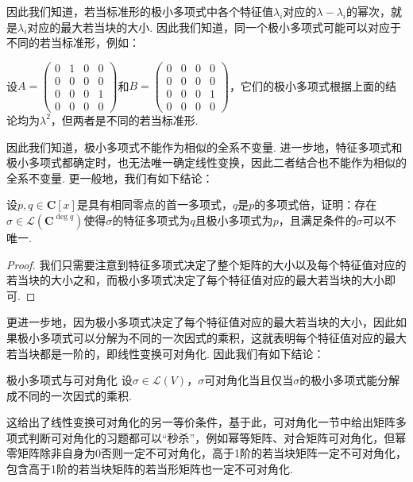 因此我们知道，若当标准形的极小多项式中各个特征值$\lambda_i$对应的$\lambda-\lambda_i$的幂次，就是$\lambda_i$对应的最大若当块的大小. 因此我们知道，同一个极小多项式可能可以对应于不同的若当标准形，例如：
\begin{example}{}{}
    设$A=\begin{pmatrix}
            0 & 1 & 0 & 0 \\ 0 & 0 & 0 & 0 \\ 0 & 0 & 0 & 1 \\ 0 & 0 & 0 & 0
        \end{pmatrix}$和$B=\begin{pmatrix}
            0 & 0 & 0 & 0 \\ 0 & 0 & 0 & 0 \\ 0 & 0 & 0 & 1 \\ 0 & 0 & 0 & 0
        \end{pmatrix}$，它们的极小多项式根据上面的结论均为$\lambda^2$，但两者是不同的若当标准形.
\end{example}

因此我们知道，极小多项式不能作为相似的全系不变量. 进一步地，特征多项式和极小多项式都确定时，也无法唯一确定线性变换，因此二者结合也不能作为相似的全系不变量. 更一般地，我们有如下结论：
\begin{example}{}{}
    设$p,q\in\mathbf{C}[x]$是具有相同零点的首一多项式，$q$是$p$的多项式倍，证明：存在$\sigma\in \mathcal{L}(\mathbf{C}^{\deg q})$使得$\sigma$的特征多项式为$q$且极小多项式为$p$，且满足条件的$\sigma$可以不唯一.
\end{example}
\begin{proof}
    我们只需要注意到特征多项式决定了整个矩阵的大小以及每个特征值对应的若当块的大小之和，而极小多项式决定了每个特征值对应的最大若当块的大小即可.
\end{proof}

更进一步地，因为极小多项式决定了每个特征值对应的最大若当块的大小，因此如果极小多项式可以分解为不同的一次因式的乘积，这就表明每个特征值对应的最大若当块都是一阶的，即线性变换可对角化. 因此我们有如下结论：
\begin{theorem}{}{极小多项式与可对角化}
    设$\sigma\in \mathcal{L}(V)$，$\sigma$可对角化当且仅当$\sigma$的极小多项式能分解成不同的一次因式的乘积.
\end{theorem}

这给出了线性变换可对角化的另一等价条件，基于此，可对角化一节中给出矩阵多项式判断可对角化的习题都可以``秒杀''，例如幂等矩阵、对合矩阵可对角化，但幂零矩阵除非自身为0否则一定不可对角化，高于1阶的若当块矩阵一定不可对角化，包含高于1阶的若当块矩阵的若当形矩阵也一定不可对角化.

